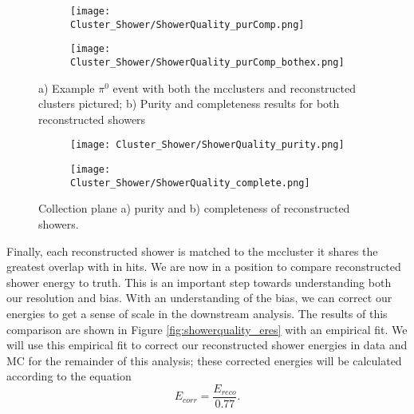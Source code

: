 \begin{figure}[t!]
\centering
  \begin{subfigure}[t]{0.4\textwidth}
    \centering
\texttt{[image: Cluster\_Shower/ShowerQuality\_purComp.png]}
  \caption{ }
  \end{subfigure} 
  \hspace{5mm}
  \begin{subfigure}[t]{0.45\textwidth}
    \centering
\texttt{[image: Cluster\_Shower/ShowerQuality\_purComp\_bothex.png]}
  \caption{ }
  \end{subfigure} 
\caption{a) Example $\pi^0$ event with both the mcclusters and reconstructed clusters pictured; b) Purity and completeness results for both reconstructed showers }
\label{fig:showerquality_purcompex}
\end{figure}


\begin{figure}[t!]
\centering
  \begin{subfigure}[t]{0.45\textwidth}
    \centering
\texttt{[image: Cluster\_Shower/ShowerQuality\_purity.png]}
  \caption{ }
  \end{subfigure} 
  \hspace{3mm}
  \begin{subfigure}[t]{0.45\textwidth}
    \centering
\texttt{[image: Cluster\_Shower/ShowerQuality\_complete.png]}
  \caption{ }
  \end{subfigure} 
\caption{Collection plane a) purity and b) completeness of reconstructed showers. }
\label{fig:showerquality_purcomp}
\end{figure}

\par  Finally, each reconstructed shower is matched to the mccluster it shares the greatest overlap with in hits. We are now in a position to compare reconstructed shower energy to truth. This is an important step towards understanding both our resolution and bias. With an understanding of the bias, we can correct our energies to get a sense of scale in the downstream analysis. The results of this comparison are shown in Figure \ref{fig:showerquality_eres} with an empirical fit. We will use this empirical fit to correct our reconstructed shower energies in data and MC for the remainder of this analysis; these corrected energies will be calculated according to the equation
\begin{equation}
\label{eq:ecorr}
E_{corr} = \frac{E_{reco}}{0.77} .
\end{equation}

